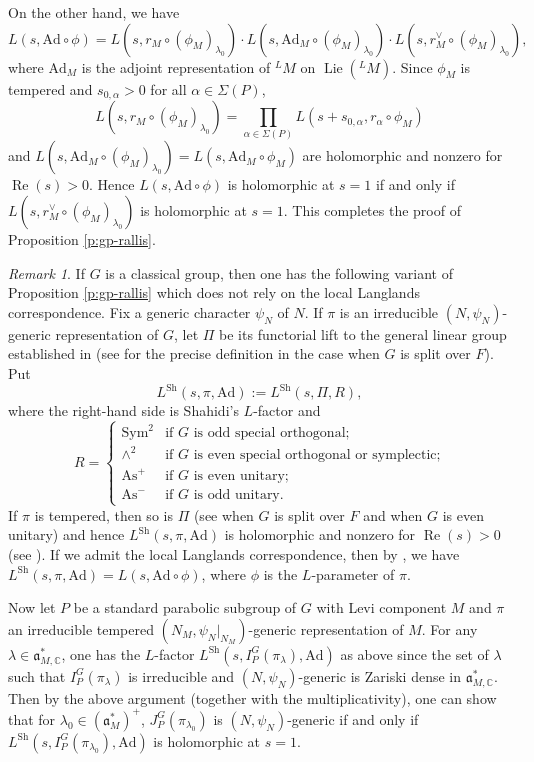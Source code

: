 \documentclass[11pt]{amsart}
\numberwithin{equation}{section}
\theoremstyle{plain}
\theoremstyle{definition}
\theoremstyle{remark}
\newtheorem{rem}[thm]{Remark}
\def\Lie{\operatorname{Lie}}
\def\Re{\operatorname{Re}}
\def\Ad{\mathrm{Ad}}
\def\As{\mathrm{As}}
\def\Sh{\mathrm{Sh}}
\def\CC{\mathbb{C}}
\def\aa{\mathfrak{a}}
\begin{document}
On the other hand, we have
\[
 L(s, \Ad \circ \phi) = 
 L(s, r_M \circ (\phi_M)_{\lambda_0}) \cdot L(s, \Ad_M \circ (\phi_M)_{\lambda_0}) \cdot L(s, r_M^\vee \circ (\phi_M)_{\lambda_0}),
\]
where $\Ad_M$ is the adjoint representation of ${}^L M$ on $\Lie({}^L M)$.
Since $\phi_M$ is tempered and $s_{0,\alpha} > 0$ for all $\alpha \in \Sigma(P)$,
\[
 L(s, r_M \circ (\phi_M)_{\lambda_0}) = \prod_{\alpha \in \Sigma(P)}  L(s + s_{0,\alpha}, r_\alpha \circ \phi_M)
\]
and $L(s, \Ad_M \circ (\phi_M)_{\lambda_0}) = L(s, \Ad_M \circ \phi_M)$ are holomorphic and nonzero for $\Re(s) > 0$.
Hence $L(s, \Ad \circ \phi)$ is holomorphic at $s=1$ if and only if $L(s, r_M^\vee \circ (\phi_M)_{\lambda_0})$ is holomorphic at $s=1$.
This completes the proof of Proposition \ref{p:gp-rallis}.

\begin{rem}
If $G$ is a classical group, then one has the following variant of Proposition \ref{p:gp-rallis} which does not rely on the local Langlands correspondence.
Fix a generic character $\psi_N$ of $N$.
If $\pi$ is an irreducible $(N,\psi_N)$-generic representation of $G$, let $\Pi$ be its functorial lift to the general linear group established in \cite{ckpss01, ckpss04, kk04, kk05, cpss11} (see \cite[Definition 7.1]{ckpss04} for the precise definition in the case when $G$ is split over $F$).
Put 
\[
 L^{\Sh}(s, \pi, {\Ad}) := L^{\Sh}(s, \Pi, R),
\]
where the right-hand side is Shahidi's $L$-factor \cite{shahidi} and 
\[
 R = 
 \begin{cases}
  \mathrm{Sym}^2 & \text{if $G$ is odd special orthogonal;} \\
  \wedge^2 & \text{if $G$ is even special orthogonal or symplectic;} \\
  \As^+ & \text{if $G$ is even unitary;} \\
  \As^- & \text{if $G$ is odd unitary.}
 \end{cases}
\]
If $\pi$ is tempered, then so is $\Pi$ (see \cite[Proposition 7.4]{ckpss04} when $G$ is split over $F$ and \cite[Proposition 8.6]{kk05} when $G$ is even unitary) and hence $L^{\Sh}(s, \pi, {\Ad})$ is holomorphic and nonzero for $\Re(s)>0$ (see \cite[Proposition 7.2]{shahidi}).
If we admit the local Langlands correspondence, then by \cite{he2}, we have $L^{\Sh}(s, \pi, {\Ad}) = L(s, {\Ad} \circ \phi)$, where $\phi$ is the $L$-parameter of $\pi$.

Now let $P$ be a standard parabolic subgroup of $G$ with Levi component $M$ and $\pi$ an irreducible tempered $(N_M, \psi_N|_{N_M})$-generic representation of $M$.
For any $\lambda \in \aa_{M,\CC}^*$, one has the $L$-factor $L^{\Sh}(s, I^G_P(\pi_\lambda), {\Ad})$ as above since the set of $\lambda$ such that $I^G_P(\pi_\lambda)$ is irreducible and $(N,\psi_N)$-generic is Zariski dense in $\aa_{M,\CC}^*$.
Then by the above argument (together with the multiplicativity), one can show that for $\lambda_0 \in (\aa_M^*)^+$, $J^G_P(\pi_{\lambda_0})$ is $(N, \psi_N)$-generic if and only if $L^{\Sh}(s, I^G_P(\pi_{\lambda_0}), {\Ad})$ is holomorphic at $s=1$.
\end{rem}
\end{document}
